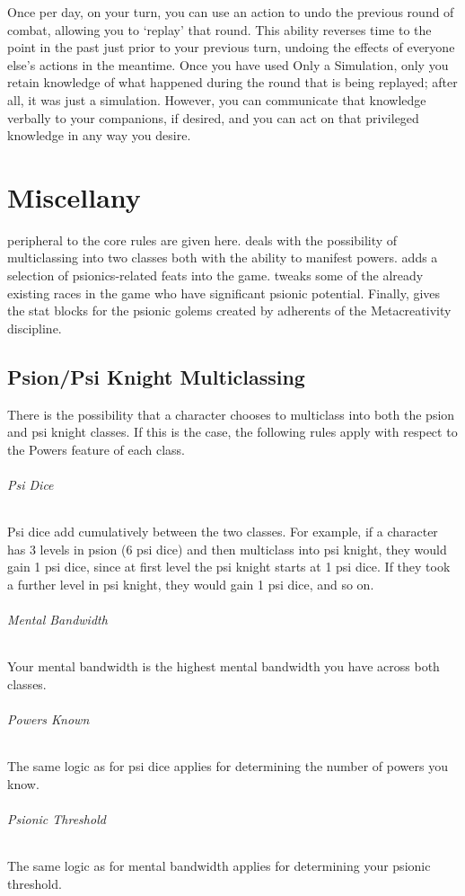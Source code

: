Once per day, on your turn,
you can use an action to undo the previous round of combat,
allowing you to `replay' that round.
This ability reverses time to the point in the past
just prior to your previous turn,
undoing the effects of everyone else's actions in the meantime.
Once you have used Only a Simulation,
only you retain knowledge of what happened during the round
that is being replayed; after all, it was just a simulation.
However, you can communicate that knowledge verbally to your companions,
if desired,
and you can act on that privileged knowledge
in any way you desire.

\chapter{Miscellany}
\label{chap:miscellany}
peripheral to the core rules are given here.
 deals with the
possibility of multiclassing into two classes both with
the ability to manifest powers.
 adds a selection of psionics-related
feats into the game.
 tweaks some of the already existing
races in the game who have significant psionic potential.
Finally,
 gives the stat blocks for the
psionic golems created by adherents of the
Metacreativity discipline.

\section{Psion/Psi Knight Multiclassing}
\label{sec:psion_psi_knight_multiclassing}
There is the possibility that a character chooses to multiclass
into both the psion and psi knight classes.
If this is the case,
the following rules apply with respect to the Powers feature
of each class.
\subparagraph{Psi Dice}
    Psi dice add cumulatively between the two classes.
    For example,
    if a character has 3 levels in psion (6 psi dice)
    and then multiclass into psi knight,
    they would gain 1 psi dice,
    since at first level the psi knight starts at 1 psi dice.
    If they took a further level in psi knight,
    they would gain 1 psi dice,
    and so on.
\subparagraph{Mental Bandwidth}
    Your mental bandwidth is the highest mental bandwidth you
    have across both classes.
\subparagraph{Powers Known}
    The same logic as for psi dice applies for
    determining the number of powers you know.
\subparagraph{Psionic Threshold}
    The same logic as for mental bandwidth applies for
    determining your psionic threshold.


